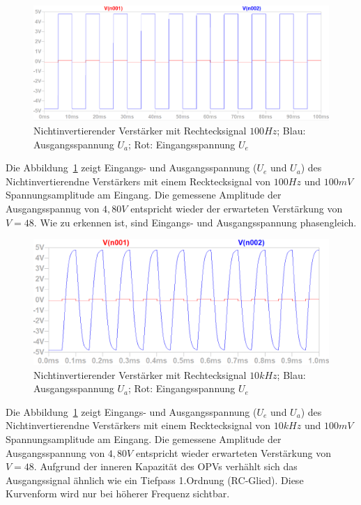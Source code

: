 \documentclass[12pt,a4paper,titlepage]{article}
\begin{document}
\begin{figure}[H]
  \centering
  \includegraphics[width=150mm]{nichtinvertierend_pulse_eingangs_ausgangsspannung}
  \caption{Nichtinvertierender Verst\"arker mit Rechtecksignal $100Hz$; Blau: Ausgangsspannung $U_a$; Rot: Eingangsspannung $U_e$}
  \label{figure03}
\end{figure}
Die Abbildung~\ref{figure03} zeigt Eingangs- und Ausgangsspannung ($U_e$ und $U_a$) des Nichtinvertierendne Verst\"arkers mit einem Recktecksignal von $100Hz$ und $100mV$ Spannungsamplitude am Eingang. Die gemessene Amplitude der Ausgangsspannug von $4,80V$ entspricht wieder der erwarteten Verst\"arkung von $V = 48$. Wie zu erkennen ist, sind Eingangs- und Ausgangsspannung phasengleich.

\begin{figure}[H]
  \centering
  \includegraphics[width=150mm]{nichtinvertierend_pulse2_eingangs_ausgangsspannung}
  \caption{Nichtinvertierender Verst\"arker mit Rechtecksignal $10kHz$; Blau: Ausgangsspannung $U_a$; Rot: Eingangsspannung $U_e$}
  \label{figure04}
\end{figure}
Die Abbildung~\ref{figure03} zeigt Eingangs- und Ausgangsspannung ($U_e$ und $U_a$) des Nichtinvertierendne Verst\"arkers mit einem Recktecksignal von $10kHz$ und $100mV$ Spannungsamplitude am Eingang. Die gemessene Amplitude der Ausgangsspannung von $4,80V$ entspricht wieder erwarteten Verst\"arkung von $V = 48$. Aufgrund der inneren Kapazit\"at des OPVs verh\"ahlt sich das Ausgangssignal \"ahnlich wie ein Tiefpass 1.Ordnung (RC-Glied). Diese Kurvenform wird nur bei h\"oherer Frequenz sichtbar.
\end{document}

